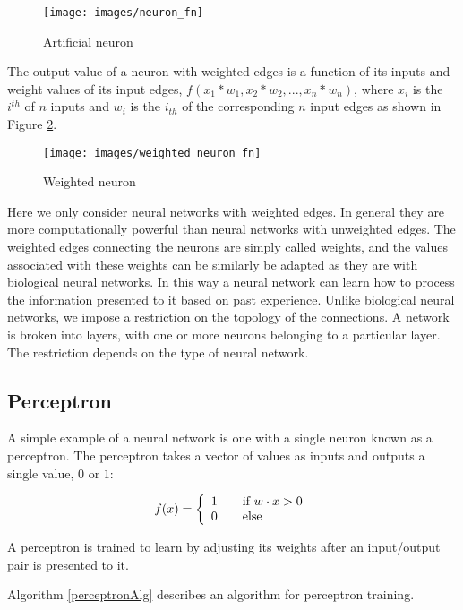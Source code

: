 \begin{figure}[h!]
  \centering
  \texttt{[image: images/neuron\_fn]}
  \caption{Artificial neuron}
  \label{neuron}
\end{figure}

The output value of a neuron with weighted edges is a function of its
inputs and weight values of its input edges, $f(x_1 * w_1, x_2 * w_2,
..., x_n * w_n)$, where $x_i$ is the $i^{th}$ of $n$ inputs and $w_i$
is the $i_{th}$ of the corresponding $n$ input edges as shown in
Figure \ref{weighted_neuron}.

\begin{figure}[h!]
  \centering
  \texttt{[image: images/weighted\_neuron\_fn]}
  \caption{Weighted neuron}
  \label{weighted_neuron}
\end{figure}

Here we only consider neural networks with weighted edges. 
In general they are more computationally powerful than neural networks with unweighted edges.
The weighted edges connecting the neurons are simply called weights, and the values associated with these weights can be similarly be adapted as they are with biological neural networks. 
In this way a neural network can learn how to process the information presented to it based on past experience. 
Unlike biological neural networks, we impose a restriction on the topology of the connections.
A network is broken into layers, with one or more neurons belonging to a particular layer.
The restriction depends on the type of neural network.

\subsection{Perceptron}
A simple example of a neural network is one with a single neuron known as a perceptron.
The perceptron takes a vector of values as inputs and outputs a single value, $0$ or $1$:

\[
  f(x) = \left\{ 
  \begin{array}{l l}
    1 & \quad \text{if $w \cdot x > 0$}\\
    0 & \quad \text{else}\\
  \end{array} \right.
\]

A perceptron is trained to learn by adjusting its weights after an
input/output pair is presented to it.

Algorithm \ref{perceptronAlg} describes an algorithm for perceptron training.

